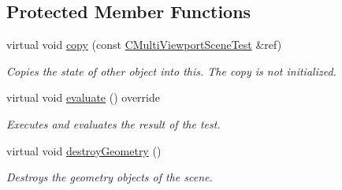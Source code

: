 \subsection*{Protected Member Functions}
\begin{DoxyCompactItemize}
\item 
\mbox{\label{class_unit_test_1_1_c_multi_viewport_scene_test_afbe2075afaff13d42fb94b89815cab2b}} 
virtual void \mbox{\hyperlink{class_unit_test_1_1_c_multi_viewport_scene_test_afbe2075afaff13d42fb94b89815cab2b}{copy}} (const \mbox{\hyperlink{class_unit_test_1_1_c_multi_viewport_scene_test}{C\+Multi\+Viewport\+Scene\+Test}} \&ref)
\begin{DoxyCompactList}\small\item\em Copies the state of other object into this. The copy is not initialized. \end{DoxyCompactList}\item 
\mbox{\label{class_unit_test_1_1_c_multi_viewport_scene_test_ad27b8bf647853831799c54e6aa417949}} 
virtual void \mbox{\hyperlink{class_unit_test_1_1_c_multi_viewport_scene_test_ad27b8bf647853831799c54e6aa417949}{evaluate}} () override
\begin{DoxyCompactList}\small\item\em Executes and evaluates the result of the test. \end{DoxyCompactList}\item 
\mbox{\label{class_unit_test_1_1_c_multi_viewport_scene_test_a824e5420401d37615568203eb4d97202}} 
virtual void \mbox{\hyperlink{class_unit_test_1_1_c_multi_viewport_scene_test_a824e5420401d37615568203eb4d97202}{destroy\+Geometry}} ()
\begin{DoxyCompactList}\small\item\em Destroys the geometry objects of the scene. \end{DoxyCompactList}\end{DoxyCompactItemize}
